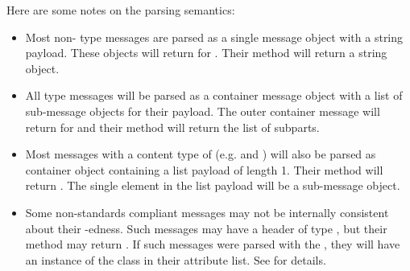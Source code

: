Here are some notes on the parsing semantics:

\begin{itemize}
\item Most non- type messages are parsed as a single
      message object with a string payload.  These objects will return
       for .  Their
       method will return a string object.

\item All  type messages will be parsed as a
      container message object with a list of sub-message objects for
      their payload.  The outer container message will return
       for  and their
       method will return the list of
       subparts.

\item Most messages with a content type of 
      (e.g.  and
      ) will also be parsed as container
      object containing a list payload of length 1.  Their
       method will return .  The
      single element in the list payload will be a sub-message object.

\item Some non-standards compliant messages may not be internally consistent
      about their -edness.  Such messages may have a
       header of type , but their
       method may return .  If such
      messages were parsed with the , they will have an
      instance of the  class in their
       attribute list.  See  for
      details.
\end{itemize}

